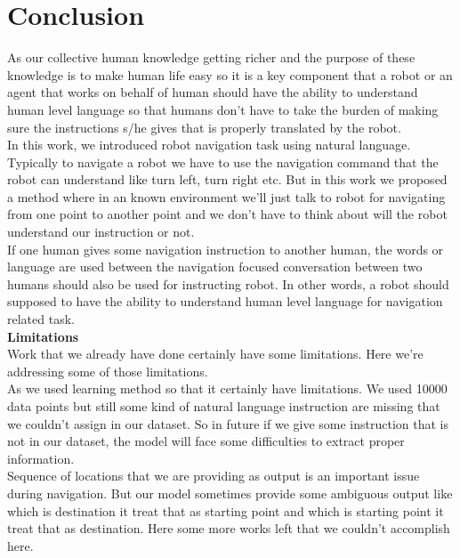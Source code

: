 \chapter{Conclusion}
As our collective human knowledge getting richer and the purpose of these knowledge is to make human life easy so it is a key component that a robot or an agent that works on behalf of human should have the ability to understand human level language so that humans don't have to take the burden of making sure the instructions s/he gives that is properly translated by the robot. \\

In this work, we introduced robot navigation task using natural language. Typically to navigate a robot we have to use the navigation command that the robot can understand like turn left, turn right etc. But in this work we proposed a method where in an known environment we'll just talk to robot for navigating from one point to another point and we don't have to think about will the robot understand our instruction or not. \\

If one human gives some navigation instruction to another human, the words or language are used between the navigation focused conversation between two humans should also be used for instructing robot. In other words, a robot should supposed to have the ability to understand human level language for navigation related task. \\


\textbf{Limitations} \\
Work that we already have done certainly have some limitations. Here we're addressing some of those limitations. \\

As we used learning method so that it certainly have limitations. We used 10000 data points but still some kind of natural language instruction are missing that we couldn't assign in our dataset. So in future if we give some instruction that is not in our dataset, the model will face some difficulties to extract proper information. \\

Sequence of locations that we are providing as output is an important issue during navigation. But our model sometimes provide some ambiguous output like which is destination it treat that as starting point and which is starting point it treat that as destination. Here some more works left that we couldn't accomplish here. \\

